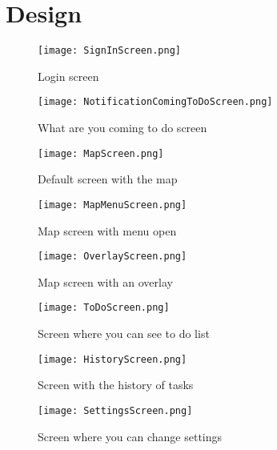 \section{Design}

\begin{figure}[h]
		\centering
		\texttt{[image: SignInScreen.png]}
		\caption{Login screen}\label{signInScreen}
	\endminipage\hfill
		\centering
		\texttt{[image: NotificationComingToDoScreen.png]}
		\caption{What are you coming to do screen}\label{comingToDoScreen}
	\endminipage\hfill
\end{figure}

\begin{figure}[h]
		\centering
		\texttt{[image: MapScreen.png]}
		\caption{Default screen with the map}\label{mapScreen}
	\endminipage\hfill
		\centering
		\texttt{[image: MapMenuScreen.png]}
		\caption{Map screen with menu open}\label{mapMenuScreen}
	\endminipage\hfill
		\centering
		\texttt{[image: OverlayScreen.png]}
		\caption{Map screen with an overlay}\label{overlayScreen}
	\endminipage\hfill
\end{figure}

\begin{figure}[h]
	\centering
	\texttt{[image: ToDoScreen.png]}
	\caption{Screen where you can see to do list}\label{toDoScreen}
	\endminipage\hfill
	\centering
	\texttt{[image: HistoryScreen.png]}
	\caption{Screen with the history of tasks}\label{historyScreen}
	\endminipage\hfill
	\centering
	\texttt{[image: SettingsScreen.png]}
	\caption{Screen where you can change settings}\label{settingsScreen}
	\endminipage\hfill
\end{figure}